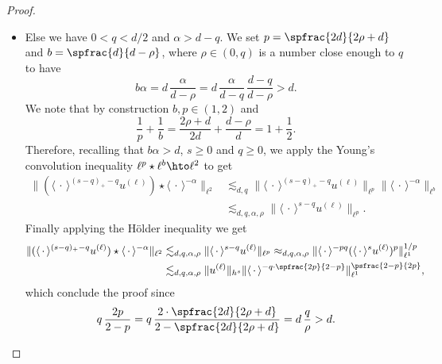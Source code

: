 \begin{proof}
\begin{itemize}
\item
Else we have $0<q<d/2$ and $\alpha > d-q$. We set $p = \spfrac{2d}{2\rho+d}$ and $b = \spfrac{d}{d -\rho}$, where $\rho \in (0,q)$ is a number close enough to $q$ to have
\[
b \alpha = d \,\frac{\alpha}{d-\rho} = d \,\frac{\alpha}{d-q}\, \frac{d-q}{d-\rho} > d.
\]
We note that by construction $b,p\in (1,2)$ and
\[
\frac1p + \frac1b =\frac{2\rho+d}{2d} + \frac{d -\rho}{d} =1+\frac12.
\]
Therefore, recalling that $b\alpha >d$, $s\geq 0$ and $q\geq 0$, we apply the Young's convolution inequality $\ell^p \star \ell^b \hto \ell^2$ to get
\begin{equation*}
\begin{split}
\| (\langle \, \cdot\,\rangle^{(s-q)_+-q} u^{(\ell)}) \star \langle \, \cdot \, \rangle^{-\alpha} \|_{\ell^2} &\lesssim_{d,q} \| \langle \, \cdot\,\rangle^{(s-q)_+-q} u^{(\ell)}\|_{\ell^p} \|\langle \, \cdot \, \rangle^{-\alpha} \|_{\ell^b} \\ &\lesssim_{d,q,\alpha,\rho} \| \langle \, \cdot\,\rangle^{s-q} u^{(\ell)}\|_{\ell^p}.
\end{split}
\end{equation*}
Finally applying the Hölder inequality we get
\begin{equation*}
\begin{split}
\| (\langle \, \cdot\,\rangle^{(s-q)_+-q} u^{(\ell)}) \star \langle \, \cdot \, \rangle^{-\alpha} \|_{\ell^2} &\lesssim_{d,q,\alpha,\rho} \| \langle \, \cdot\,\rangle^{s-q} u^{(\ell)}\|_{\ell^p} \approx_{d,q,\alpha,\rho} \| \langle \, \cdot\,\rangle^{-pq} (\langle \, \cdot\,\rangle^{s} u^{(\ell)})^p\|_{\ell^1}^{1/p} \\
&\lesssim_{d,q,\alpha,\rho} \| u^{(\ell)} \|_{h^s} \| \langle \, \cdot\,\rangle^{-q\cdot \spfrac{2p}{2-p}} \|_{\ell^1}^{\psfrac{2-p}{2p}},
\end{split}
\end{equation*}
which conclude the proof since
\[
q\, \frac{2p}{2-p} = q\, \frac{2\cdot\spfrac{2d}{2\rho+d}}{2-\spfrac{2d}{2\rho+d}} = d\, \frac{q}{\rho} > d.\qedhere
\]
\end{itemize}
\end{proof}

